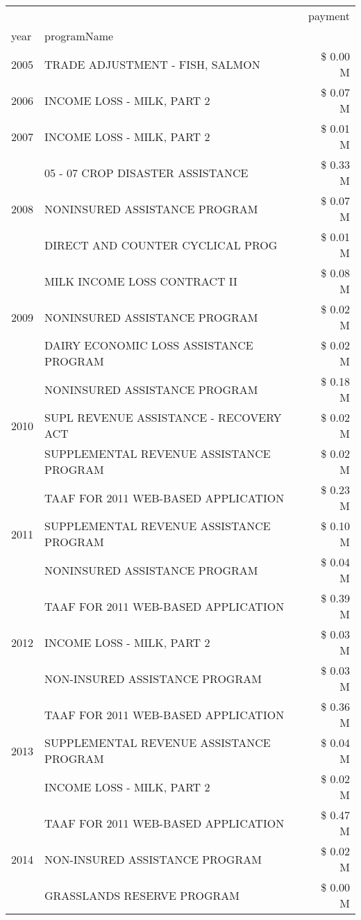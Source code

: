 \begin{tabular}{llr}
\toprule
 &  & payment \\
year & programName &  \\
\midrule
2005 & TRADE ADJUSTMENT - FISH, SALMON & \$ 0.00 M \\
\cline{1-3}
2006 & INCOME LOSS - MILK, PART 2 & \$ 0.07 M \\
\cline{1-3}
2007 & INCOME LOSS - MILK, PART 2 & \$ 0.01 M \\
\cline{1-3}
\multirow[t]{3}{*}{2008} & 05 - 07 CROP DISASTER ASSISTANCE & \$ 0.33 M \\
 & NONINSURED ASSISTANCE PROGRAM & \$ 0.07 M \\
 & DIRECT AND COUNTER CYCLICAL PROG & \$ 0.01 M \\
\cline{1-3}
\multirow[t]{3}{*}{2009} & MILK INCOME LOSS CONTRACT II & \$ 0.08 M \\
 & NONINSURED ASSISTANCE PROGRAM & \$ 0.02 M \\
 & DAIRY ECONOMIC LOSS ASSISTANCE PROGRAM & \$ 0.02 M \\
\cline{1-3}
\multirow[t]{3}{*}{2010} & NONINSURED ASSISTANCE PROGRAM & \$ 0.18 M \\
 & SUPL REVENUE ASSISTANCE - RECOVERY ACT & \$ 0.02 M \\
 & SUPPLEMENTAL REVENUE ASSISTANCE PROGRAM & \$ 0.02 M \\
\cline{1-3}
\multirow[t]{3}{*}{2011} & TAAF FOR 2011 WEB-BASED APPLICATION & \$ 0.23 M \\
 & SUPPLEMENTAL REVENUE ASSISTANCE PROGRAM & \$ 0.10 M \\
 & NONINSURED ASSISTANCE PROGRAM & \$ 0.04 M \\
\cline{1-3}
\multirow[t]{3}{*}{2012} & TAAF FOR 2011 WEB-BASED APPLICATION & \$ 0.39 M \\
 & INCOME LOSS - MILK, PART 2 & \$ 0.03 M \\
 & NON-INSURED ASSISTANCE PROGRAM & \$ 0.03 M \\
\cline{1-3}
\multirow[t]{3}{*}{2013} & TAAF FOR 2011 WEB-BASED APPLICATION & \$ 0.36 M \\
 & SUPPLEMENTAL REVENUE ASSISTANCE PROGRAM & \$ 0.04 M \\
 & INCOME LOSS - MILK, PART 2 & \$ 0.02 M \\
\cline{1-3}
\multirow[t]{3}{*}{2014} & TAAF FOR 2011 WEB-BASED APPLICATION & \$ 0.47 M \\
 & NON-INSURED ASSISTANCE PROGRAM & \$ 0.02 M \\
 & GRASSLANDS RESERVE PROGRAM & \$ 0.00 M \\

\end{tabular}
